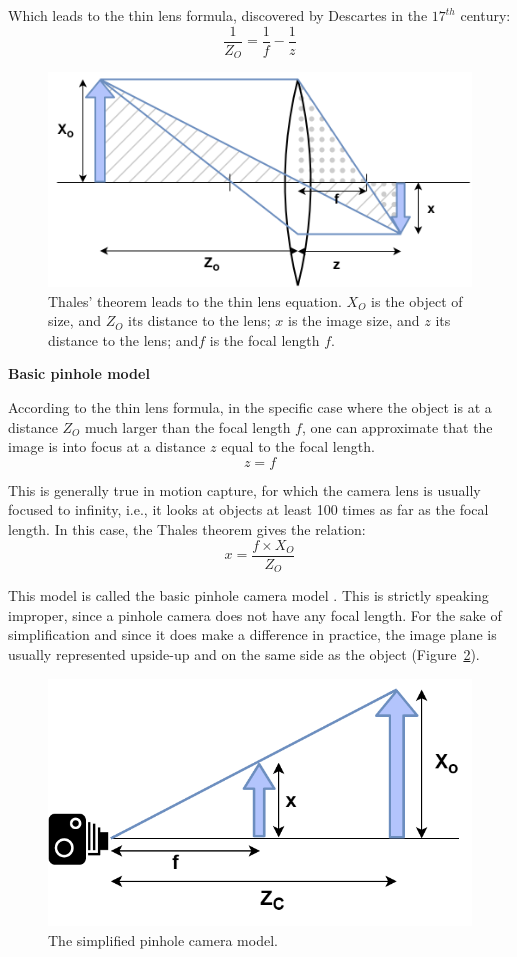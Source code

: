 Which leads to the thin lens formula, discovered by Descartes in the $17^{th}$ century:
\begin{equation}
    \frac{1}{Z_O} = \frac{1}{f} - \frac{1}{z}
\end{equation}

\begin{figure}[hbtp]
	\centering
	\def\svgwidth{\columnwidth}
	\fontsize{10pt}{10pt}\selectfont
	\includegraphics[width=0.5\linewidth]{"../Chap2/Figures/Thin_Lens.png"}
	\caption{Thales' theorem leads to the thin lens equation. \(X_O\) is the object of size, and \(Z_O\) its distance to the lens; \(x\) is the image size, and \(z\) its distance to the lens; and\(f\) is the focal length \(f\).} 
	\label{fig_thinlens}
\end{figure}

\noindent\textbf{Basic pinhole model}

According to the thin lens formula, in the specific case where the object is at a distance \(Z_O\) much larger than the focal length \(f\), one can approximate that the image is into focus at a distance \(z\) equal to the focal length. 
\begin{equation}
    z=f
\end{equation}

This is generally true in motion capture, for which the camera lens is usually focused to infinity, i.e., it looks at objects at least 100 times as far as the focal length. In this case, the Thales theorem gives the relation:
\begin{equation}
  x=\frac{f\times X_O}{Z_O}
\end{equation}

This model is called the basic pinhole camera model \cite{Zhang2000,Hartley2003,Tomasi2017}. This is strictly speaking improper, since a pinhole camera does not have any focal length. For the sake of simplification and since it does make a difference in practice, the image plane is usually represented upside-up and on the same side as the object (Figure~\ref{fig_cameralens}). 

\begin{figure}[hbtp]
	\centering
	\def\svgwidth{\columnwidth}
	\fontsize{10pt}{10pt}\selectfont
	\includegraphics[width=0.5\linewidth]{"../Chap2/Figures/Camera_Lens.png"}
	\caption{The simplified pinhole camera model.} 
	\label{fig_cameralens}
\end{figure}


